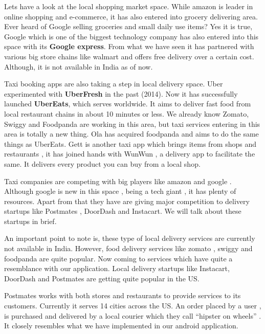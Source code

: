 \documentclass{report}
\begin{document}
\par Let\textquotesingle s have a look at the local shopping market space. While amazon is leader in online shopping and e-commerce, it has also entered into grocery delivering area. Ever heard of Google selling groceries and small daily use items? Yes it is true, Google which is one of the biggest technology company has also entered into this space with its
\textbf{Google express}. From what we have seen it has partnered  with various big store chains like walmart and offers free delivery over a certain cost. Although, it is not available in India as of now.

\par Taxi booking apps are also taking a step in local delivery space. Uber experimented with \textbf{UberFresh} in the past (2014). Now it has successfully launched \textbf{UberEats}, which serves worldwide.  It aims to deliver fast food from local restaurant chains in about 10 minutes or less. We already know Zomato, Swiggy and Foodpanda are working in this area, but taxi services entering in this area is totally a new thing. Ola has acquired foodpanda and aims to do the same things as UberEats.
Gett is another taxi app which brings items from shops and restaurants , it has joined hands with WunWun , a delivery app to facilitate the same. It delivers every product you can buy from a local shop. 

\par Taxi companies are competing with big players like amazon and google . Although google is new in this space , being a tech giant , it has plenty of resources. Apart from that they have are giving major competition to delivery startups like Postmates , DoorDash and Instacart. We will talk about these startups in brief.

An important point to note is, these type of local delivery services are currently not available in India. However, food delivery services like zomato , swiggy and foodpanda are quite popular.
Now coming to services which have quite a resemblance with our application.
Local delivery startups like Instacart, DoorDash and  Postmates are getting quite popular in the US.

Postmates works with both stores and restaurants to provide services to its customers. Currently it serves 14 cities across the US. An order placed by a user ,  is purchased and delivered by a local courier which they call “hipster on wheels” . It closely resembles what we have implemented in our android application. 
\end{document}
